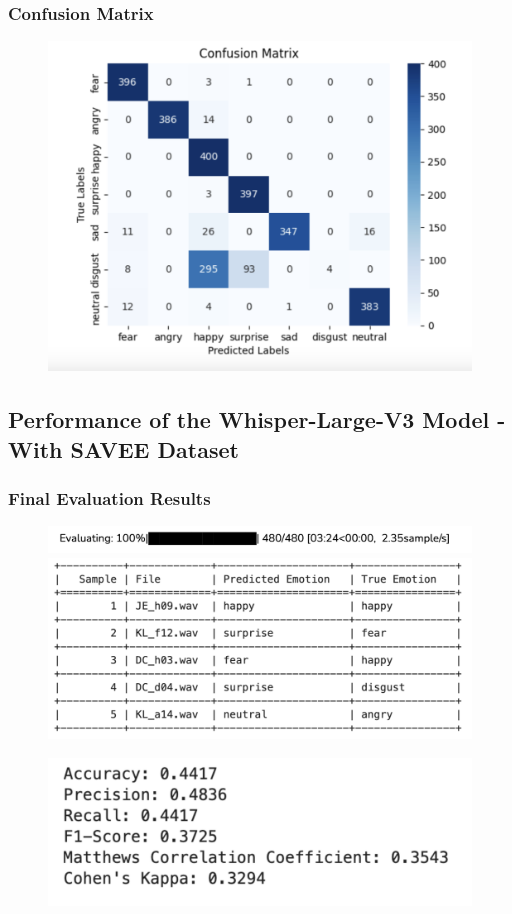 \documentclass[a4paper,12pt]{article}
\begin{document}
\subsubsection{Confusion Matrix}
\begin{figure}[H]
    \centering
    \includegraphics[width=1\linewidth]{ConfusionMatrix1.png}
\end{figure}
\newpage
\subsection{Performance of the Whisper-Large-V3 Model - With SAVEE Dataset}
\subsubsection{Final Evaluation Results}
\begin{figure}[H]
    \centering
    \includegraphics[width=1\linewidth]{521.png}
    \includegraphics[width=1\linewidth]{522.png}
\end{figure}
\begin{figure}[H]
    \centering
    \includegraphics[width=1\linewidth]{523.png}
\end{figure}
\end{document}
